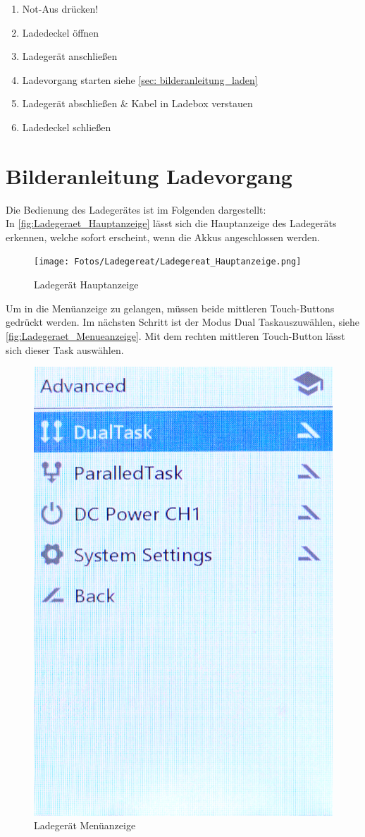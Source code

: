 \begin{enumerate}
    \item Not-Aus drücken!
    \item Ladedeckel öffnen
    \item Ladegerät anschließen
    \item Ladevorgang starten siehe \ref{sec: bilderanleitung_laden}
    \item Ladegerät abschließen \& Kabel in Ladebox verstauen
    \item Ladedeckel schließen
\end{enumerate}

\newpage
\section{Bilderanleitung Ladevorgang \label{sec: bilderanleitung_laden}}
Die Bedienung des Ladegerätes ist im Folgenden dargestellt: \\

In \autoref{fig:Ladegeraet_Hauptanzeige} lässt sich die Hauptanzeige des Ladegeräts erkennen, welche 
sofort erscheint, wenn die Akkus angeschlossen werden. 

\begin{figure}[H]
    \centering
    \texttt{[image: Fotos/Ladegereat/Ladegereat\_Hauptanzeige.png]}
    \caption{Ladegerät Hauptanzeige \label{fig:Ladegeraet_Hauptanzeige}}
\end{figure}

Um in die Menüanzeige zu gelangen, müssen beide mittleren Touch-Buttons gedrückt werden.
Im nächsten Schritt ist der Modus \glqq Dual Task\grqq auszuwählen, siehe \autoref{fig:Ladegeraet_Menueanzeige}. Mit dem rechten mittleren Touch-Button lässt sich 
dieser Task auswählen. 
\begin{figure}[H]
    \centering
    \includegraphics[width=.3\textwidth]{Fotos/Ladegereat/DSC_8744_Lademenue.png}
    \caption{Ladegerät Menüanzeige \label{fig:Ladegeraet_Menueanzeige}}
\end{figure}

